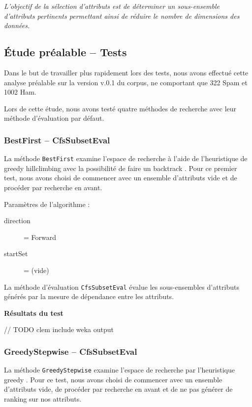 \textit{L'objectif de la sélection d'attributs est de déterminer un sous-ensemble d'attributs pertinents permettant ainsi de réduire le nombre de dimensions des données.}

\subsection{Étude préalable -- Tests}

Dans le but de travailler plus rapidement lors des tests, nous avons effectué cette analyse préalable sur la version v.0.1 du corpus, ne comportant que 322 Spam et 1002 Ham.

Lors de cette étude, nous avons testé quatre méthodes de recherche avec leur méthode d'évaluation par défaut.

\subsubsection{BestFirst -- CfsSubsetEval}

La méthode \texttt{BestFirst} examine l'espace de recherche à l'aide de l'heuristique de \og greedy hillclimbing \fg{} avec la possibilité de faire un  \og backtrack \fg{}.  Pour ce premier test, nous avons choisi de commencer avec un ensemble d'attributs vide et de procéder par recherche en avant.

Paramètres de l'algorithme : 
\begin{description}
	\item[direction] = Forward
	\item[startSet] = (vide)
\end{description}

La méthode d'évaluation \texttt{CfsSubsetEval} évalue les sous-ensembles d'attributs générés par la mesure de dépendance entre les attributs.

\textbf{Résultats du test}

// TODO clem include weka output

\subsubsection{GreedyStepwise -- CfsSubsetEval}

La méthode \texttt{GreedyStepwise} examine l'espace de recherche par l'heuristique \og greedy \fg{}. Pour ce test, nous avons choisi de commencer avec un ensemble d'attributs vide, de procéder par recherche en avant et de ne pas générer de \og ranking \fg{} sur nos attributs.


